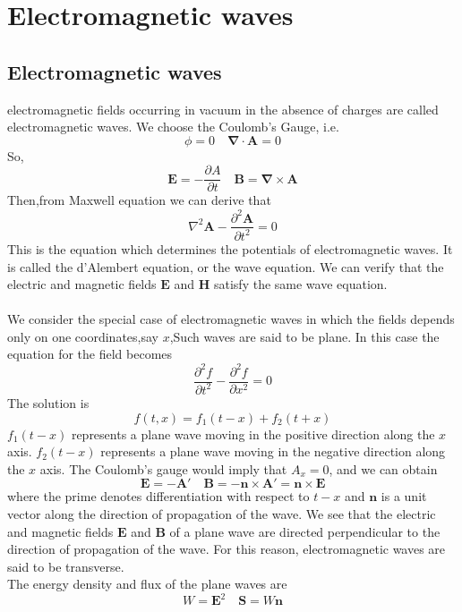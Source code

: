 \documentclass[cyan]{elegantnote}
\begin{document}
\section{Electromagnetic waves}
\subsection{Electromagnetic waves}
electromagnetic fields occurring in vacuum in the absence of  charges are called electromagnetic waves. We choose the Coulomb's Gauge, i.e.
\[ \phi = 0 \quad \bm{\nabla} \cdot \bm{A} = 0\]
So,
\[\bm{E} = -\frac{\partial A}{\partial t} \quad \bm{B} = \bm{\nabla} \times \bm{A}\]
Then,from Maxwell equation we can derive that
\[\nabla^2 \bm{A} - \frac{\partial^2 \bm{A}}{\partial t^2} = 0\]
This is the equation which determines the potentials of electromagnetic waves. It is called the d'Alembert equation, or the wave equation. We can verify that the electric and magnetic fields $\bm{E}$ and $\bm{H}$ satisfy the same wave equation.\\ \\
We consider the special case of electromagnetic waves in which the fields depends only on one coordinates,say $x$,Such waves are said to be plane. In this case the equation for the field becomes
\[\frac{\partial^2 f}{\partial t^2}  - \frac{\partial^2 f}{\partial x^2} = 0\]
The solution is
\[f(t,x) = f_1(t-x) + f_2(t+x)\]
$f_1(t-x)$ represents a plane wave moving in the positive direction along the $x$ axis. $f_2(t-x)$ represents a plane wave moving in the negative direction along the $x$ axis. The Coulomb's gauge would imply that $A_x = 0$, and we can obtain
\[\bm{E} = -\bm{A}' \quad \bm{B} = -\bm{n} \times \bm{A}' = \bm{n} \times \bm{E}\]
where the prime denotes differentiation with respect to $t-x$ and $\bm{n}$ is a unit vector along the direction of propagation of the wave. We see that the electric and magnetic fields $\bm{E}$ and $\bm{B}$ of a plane wave are directed perpendicular to the direction of propagation of the wave. For this reason, electromagnetic waves are said to be transverse.\\
The energy density and flux of the plane waves are
\[W = \bm{E}^2 \quad \bm{S} = W\bm{n}\]
\end{document}
